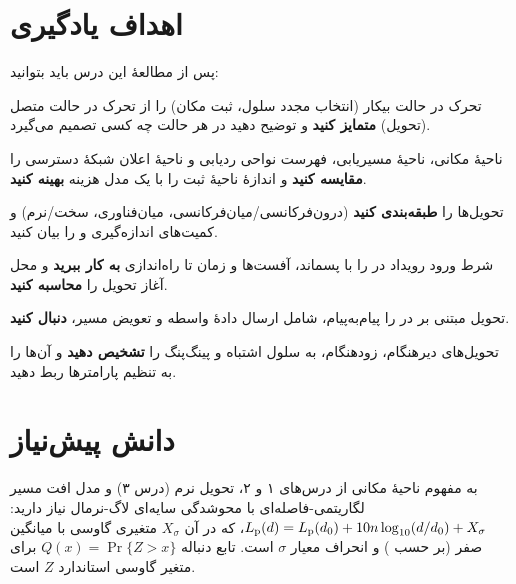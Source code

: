 \documentclass[11pt,a4paper]{article}
\begin{document}
\ACNcover

\section{اهداف یادگیری}
پس از مطالعهٔ این درس باید بتوانید:
\begin{objectives}
  \item تحرک در حالت بیکار (انتخاب مجدد سلول، ثبت مکان) را از تحرک در حالت متصل (تحویل)
        \textbf{متمایز کنید} و توضیح دهید در هر حالت چه کسی تصمیم می‌گیرد.
  \item ناحیهٔ مکانی، ناحیهٔ مسیریابی، فهرست نواحی ردیابی و ناحیهٔ اعلان شبکهٔ دسترسی را
        \textbf{مقایسه کنید} و اندازهٔ ناحیهٔ ثبت را با یک مدل هزینه \textbf{بهینه کنید}.
  \item تحویل‌ها را \textbf{طبقه‌بندی کنید} (درون‌فرکانسی/میان‌فرکانسی، میان‌فناوری، سخت/نرم) و
        کمیت‌های اندازه‌گیری  و  را بیان کنید.
  \item شرط ورود رویداد  در  را با پسماند، آفست‌ها و زمان تا راه‌اندازی
        \textbf{به کار ببرید} و محل آغاز تحویل را \textbf{محاسبه کنید}.
  \item تحویل مبتنی بر  در  را پیام‌به‌پیام، شامل ارسال دادهٔ واسطه و تعویض مسیر،
        \textbf{دنبال کنید}.
  \item تحویل‌های دیرهنگام، زودهنگام، به سلول اشتباه و پینگ‌پنگ را \textbf{تشخیص دهید} و آن‌ها را
        به تنظیم پارامترها ربط دهید.
\end{objectives}

\section{دانش پیش‌نیاز}
به مفهوم ناحیهٔ مکانی از درس‌های ۱ و ۲، تحویل نرم  (درس ۳) و مدل افت مسیر
لگاریتمی-فاصله‌ای با محوشدگی سایه‌ای لاگ-نرمال نیاز دارید:
$L_{\mathrm{p}}(d) = L_{\mathrm{p}}(d_0) + 10n\log_{10}(d/d_0) + X_\sigma$، که در آن $X_\sigma$ متغیری گاوسی با میانگین
صفر (بر حسب ) و انحراف معیار $\sigma$ است. تابع دنباله $Q(x) = \Pr\{Z > x\}$ برای متغیر
گاوسی استاندارد $Z$ است.
\end{document}
